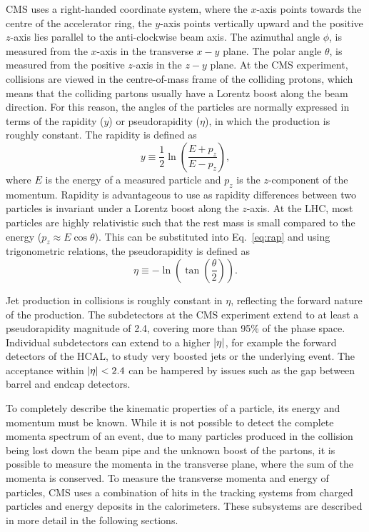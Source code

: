 CMS uses a right-handed coordinate system, where the $x$-axis points towards the centre of the accelerator ring, the $y$-axis points vertically upward and the positive $z$-axis lies parallel to the anti-clockwise beam axis. 
The azimuthal angle $\phi$, is measured from the $x$-axis in the transverse $x-y$ plane. 
The polar angle $\theta$, is measured from the positive $z$-axis in the $z-y$ plane.
At the CMS experiment, collisions are viewed in the centre-of-mass frame of the colliding protons, which means that the colliding partons usually have a Lorentz boost along the beam direction.
For this reason, the angles of the particles are normally expressed in terms of the rapidity ($y$) or pseudorapidity ($\eta$), in which the production is roughly constant.  
The rapidity is defined as
\begin{equation}
\label{eq:rap}
y\equiv {\frac{1}{2}}\ln\left({\frac{E+p_{z}}{E-p_{z}}}\right),
\end{equation}
where $E$ is the energy of a measured particle and $p_{z}$ is the $z$-component of the momentum.
Rapidity is advantageous to use as rapidity differences between two particles is invariant under a Lorentz boost along the $z$-axis.
At the LHC, most particles are highly relativistic such that the rest mass is small compared to the energy ($p_{z}\approx E\cos\theta$). This can be substituted into Eq.~\ref{eq:rap} and using trigonometric relations, the pseudorapidity is defined as
\begin{equation}
\label{eq:eta}
\eta \equiv -\ln\left(\tan\left({\frac{\theta}{2}}\right)\right).
\end{equation}

Jet production in \pp{} collisions is roughly constant in $\eta$, reflecting the forward nature of the production.
The subdetectors at the CMS experiment extend to at least a pseudorapidity magnitude of 2.4, covering more than 95\% of the phase space. 
Individual subdetectors can extend to a higher $\lvert \eta \rvert$, for example the forward detectors of the HCAL, to study very boosted jets or the underlying event.
The acceptance within $\lvert \eta \rvert < 2.4$ can be hampered by issues such as the gap between barrel and endcap detectors.

To completely describe the kinematic properties of a particle, its energy and momentum must be known. 
While it is not possible to detect the complete momenta spectrum of an event, due to many particles produced in the collision being lost down the beam pipe and the unknown boost of the partons, it is possible to measure the momenta in the transverse plane, where the sum of the momenta is conserved. 
To measure the transverse momenta and energy of particles, CMS uses a combination of hits in the tracking systems from charged particles and energy deposits in the calorimeters.
These subsystems are described in more detail in the following sections.

